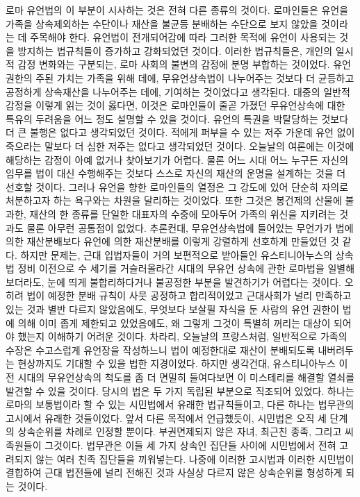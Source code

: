 로마 유언법의 이 부분이 시사하는 것은 전혀 다른 종류의 것이다.
로마인들은 유언을 가족을 상속제외하는 수단이나
재산을 불균등 분배하는 수단으로 보지 않았을 것이라는 데 주목해야 한다.
유언법이 전개되어감에 따라
그러한 목적에 유언이 사용되는 것을 방지하는 법규칙들이
증가하고 강화되었던 것이다.
이러한 법규칙들은,
개인의 일시적 감정 변화와는 구분되는,
로마 사회의 불변의 감정에 분명 부합하는 것이었다.
유언 권한의 주된 가치는 가족을 위해  데에,
무유언상속법이 나누어주는 것보다 더 균등하고 공정하게
상속재산을 나누어주는 데에,
기여하는 것이었다고 생각된다.
대중의 일반적 감정을 이렇게 읽는 것이 옳다면,
이것은 로마인들이 줄곧 가졌던 무유언상속에 대한 특유의 두려움을
어느 정도 설명할 수 있을 것이다.
유언의 특권을 박탈당하는 것보다 더 큰 불행은 없다고 생각되었던 것이다.
적에게 퍼부을 수 있는 저주 가운데
유언 없이 죽으라는 말보다 더 심한 저주는 없다고 생각되었던 것이다.
오늘날의 여론에는 이것에 해당하는 감정이 아예 없거나 찾아보기가 어렵다.
물론 어느 시대 어느 누구든
자신의 임무를 법이 대신 수행해주는 것보다
스스로 자신의 재산의 운명을 설계하는 것을
더 선호할 것이다.
그러나 유언을 향한 로마인들의 열정은 그 강도에 있어
단순히 자의로 처분하고자 하는 욕구와는 차원을 달리하는 것이었다.
또한 그것은
봉건제의 산물에 불과한,
재산의 한 종류를 단일한 대표자의 수중에 모아두어
가족의 위신을 지키려는 것과도
물론 아무런 공통점이 없었다.
추론컨대,
무유언상속법에 들어있는 무언가가
법에 의한 재산분배보다
유언에 의한 재산분배를
이렇게 강렬하게
선호하게 만들었던 것 같다.
하지만 문제는,
근대 입법자들이 거의 보편적으로 받아들인
유스티니아누스의 상속법 정비 이전으로 수 세기를
거슬러올라간 시대의
무유언 상속에 관한 로마법을 일별해 보더라도,
눈에 띄게 불합리하다거나 불공정한 부분을 발견하기가 어렵다는 것이다.
오히려 법이 예정한 분배 규칙이 사뭇 공정하고 합리적이었고
근대사회가 널리 만족하고 있는 것과 별반 다르지 않았음에도,
무엇보다
보살필 자식을 둔 사람의 유언 권한이
법에 의해 이미 좁게 제한되고 있었음에도,
왜 그렇게 그것이 특별히 꺼리는 대상이 되어야 했는지 이해하기 어려운 것이다.
차라리, 오늘날의 프랑스처럼,
일반적으로 가족의 수장은 수고스럽게 유언장을 작성하느니
법이 예정한대로 재산이 분배되도록 내버려두는 현상까지도
기대할 수 있을 법한 지경이었다.
하지만 생각건대,
유스티니아누스 이전 시대의 무유언상속의 척도를 좀 더 면밀히 들여다보면
이 미스테리를 해결할 열쇠를 발견할 수 있을 것이다.
당시의 법은 두 가지 독립된 부분으로 직조되어 있었다.
하나는 로마의 보통법이라 할 수 있는 시민법에서
유래한 법규칙들이고, 다른 하나는 법무관의 고시에서 유래한 것들이었다.
앞서 다른 목적에서 언급했듯이,
시민법은 오직 세 단계의 상속순위를 차례로 인정할 뿐이다.
부권면제되지 않은 자녀, 최근친 종족,
그리고 씨족원들이 그것이다.
법무관은
이들 세 가지 상속인 집단들 사이에
시민법에서 전혀 고려되지 않는
여러 친족 집단들을 끼워넣는다.
나중에
이러한 고시법과 이러한 시민법이 결합하여
근대 법전들에 널리 전해진 것과 사실상 다르지 않은 상속순위를
형성하게 되는 것이다.

